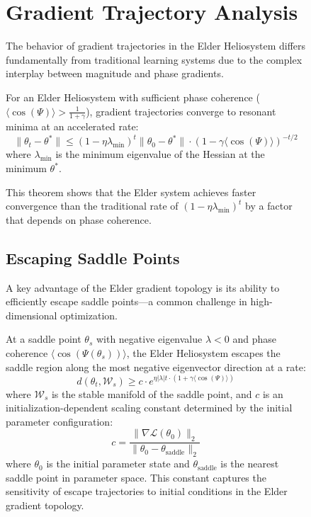 \begin{figure}[ht]
\section{Gradient Trajectory Analysis}

The behavior of gradient trajectories in the Elder Heliosystem differs fundamentally from traditional learning systems due to the complex interplay between magnitude and phase gradients.

\begin{theorem}
For an Elder Heliosystem with sufficient phase coherence ($\langle\cos(\Psi)\rangle > \frac{1}{1+\gamma}$), gradient trajectories converge to resonant minima at an accelerated rate:
\begin{equation}
\|\theta_t - \theta^*\| \leq (1 - \eta \lambda_{\min})^t \|\theta_0 - \theta^*\| \cdot (1 - \gamma \langle\cos(\Psi)\rangle)^{-t/2}
\end{equation}
where $\lambda_{\min}$ is the minimum eigenvalue of the Hessian at the minimum $\theta^*$.
\end{theorem}

This theorem shows that the Elder system achieves faster convergence than the traditional rate of $(1 - \eta \lambda_{\min})^t$ by a factor that depends on phase coherence.

\subsection{Escaping Saddle Points}

A key advantage of the Elder gradient topology is its ability to efficiently escape saddle points—a common challenge in high-dimensional optimization.

\begin{theorem}
At a saddle point $\theta_s$ with negative eigenvalue $\lambda < 0$ and phase coherence $\langle\cos(\Psi(\theta_s))\rangle$, the Elder Heliosystem escapes the saddle region along the most negative eigenvector direction at a rate:
\begin{equation}
d(\theta_t, \mathcal{W}_s) \geq c \cdot e^{\eta |\lambda| t \cdot (1 + \gamma \langle\cos(\Psi)\rangle)}
\end{equation}
where $\mathcal{W}_s$ is the stable manifold of the saddle point, and $c$ is an initialization-dependent scaling constant determined by the initial parameter configuration:
\begin{equation}
c = \frac{\|\nabla \mathcal{L}(\theta_0)\|_2}{\|\theta_0 - \theta_{\text{saddle}}\|_2}
\end{equation}
where $\theta_0$ is the initial parameter state and $\theta_{\text{saddle}}$ is the nearest saddle point in parameter space. This constant captures the sensitivity of escape trajectories to initial conditions in the Elder gradient topology.
\end{theorem}


\end{figure}
